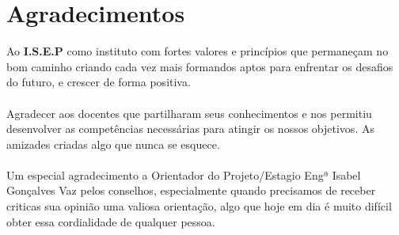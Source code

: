 \cleardoublepage
\chapter*{Agradecimentos}
\label{Agradecimentos}
Ao \textbf{I.S.E.P} como instituto com fortes valores e princípios que permaneçam no bom caminho criando cada vez mais formandos aptos para enfrentar os desafios do futuro, e crescer de forma positiva.\\
\\
Agradecer aos docentes que partilharam seus conhecimentos e nos permitiu desenvolver as competências necessárias para atingir os nossos objetivos. As amizades criadas algo que nunca se esquece.\\
\\
Um especial agradecimento a Orientador do Projeto/Estagio Engª Isabel Gonçalves Vaz pelos conselhos, especialmente quando precisamos de receber criticas sua opinião uma valiosa orientação, algo que hoje em dia é muito difícil obter essa cordialidade de qualquer pessoa.
